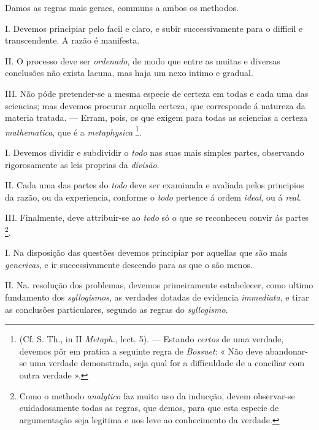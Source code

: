 
  
Damos as regras mais geraes, communs a ambos os methodos.

I. Devemos principiar pelo facil e claro, e subir successivamente para o difficil e transcendente. A razão é manifesta.

II. O processo deve ser \emph{ordenado}, de modo que entre as muitas e diversas conclusões não exista lacuna, mas haja um nexo intimo e gradual.

III. Não póde pretender-se a mesma especie de certeza em todas e cada uma das sciencias; mas devemos procurar aquella certeza, que corresponde á natureza da materia tratada. --- Erram, pois, os que exigem para todas as sciencias a certeza \emph{mathematica}, que é a \emph{metaphysica} \footnote{(Cf. S. Th., in II \emph{Metaph.}, lect. 5). --- Estando \emph{certos} de uma verdade, devemos pôr em pratica a seguinte regra de \emph{Bossuet}: « Não deve abandonar-se uma verdade demonstrada, seja qual for a difficuldade de a conciliar com outra verdade ».}.



I. Devemos dividir e subdividir o \emph{todo} nas suas mais simples partes, observando rigorosamente as leis proprias da \emph{divisão}.

II. Cada uma das partes do \emph{todo} deve ser examinada e avaliada pelos principios da razão, ou da experiencia, conforme o \emph{todo} pertence á ordem \emph{ideal}, ou á \emph{real}.

III. Finalmente, deve attribuir-se ao \emph{todo} só o que se reconheceu convir ás partes \footnote{Como o methodo \emph{analytico} faz muito uso da inducção, devem observar-se cuidadosamente todas as regras, que demos, para que esta especie de argumentação seja legitima e nos leve ao conhecimento da verdade.}.



I. Na disposição das questões devemos principiar por aquellas que são mais \emph{genericas}, e ir successivamente descendo para as que o são menos.

II. Na. resolução dos problemas, devemos primeiramente estabelecer, como ultimo fundamento dos \emph{syllogismos}, as verdades dotadas de evidencia \emph{immediata}, e tirar as conclusões particulares, segundo as regras do \emph{syllogismo}.

